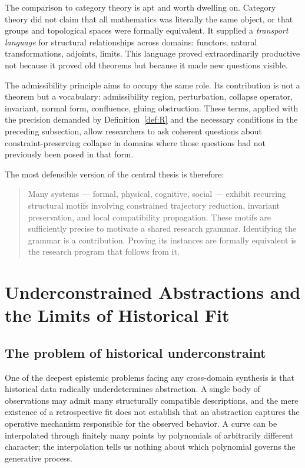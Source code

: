 \documentclass[12pt, a4paper]{article}
\theoremstyle{plain}
\theoremstyle{definition}
\theoremstyle{remark}
\begin{document}
The comparison to category theory is apt and worth dwelling on.
Category theory did not claim that all mathematics was literally the
same object, or that groups and topological spaces were formally
equivalent.
It supplied a \emph{transport language} for structural relationships
across domains: functors, natural transformations, adjoints, limits.
This language proved extraordinarily productive not because it proved
old theorems but because it made new questions visible.

The admissibility principle aims to occupy the same role.
Its contribution is not a theorem but a vocabulary:
admissibility region, perturbation, collapse operator, invariant,
normal form, confluence, gluing obstruction.
These terms, applied with the precision demanded by
Definition~\ref{def:R} and the necessary conditions in the preceding
subsection, allow researchers to ask coherent questions about
constraint-preserving collapse in domains where those questions had
not previously been posed in that form.

The most defensible version of the central thesis is therefore:

\begin{quote}
  Many systems --- formal, physical, cognitive, social --- exhibit
  recurring structural motifs involving constrained trajectory
  reduction, invariant preservation, and local compatibility
  propagation.
  These motifs are sufficiently precise to motivate a shared research
  grammar.
  Identifying the grammar is a contribution.
  Proving its instances are formally equivalent is the research
  program that follows from it.
\end{quote}

\section{Underconstrained Abstractions and the Limits of Historical Fit}
\label{sec:underconstraint}

\subsection{The problem of historical underconstraint}

One of the deepest epistemic problems facing any cross-domain synthesis is that
historical data radically underdetermines abstraction.
A single body of observations may admit many structurally compatible descriptions, and
the mere existence of a retrospective fit does not establish that an abstraction
captures the operative mechanism responsible for the observed behavior.
A curve can be interpolated through finitely many points by polynomials of arbitrarily
different character; the interpolation tells us nothing about which polynomial governs
the generative process.
\end{document}
